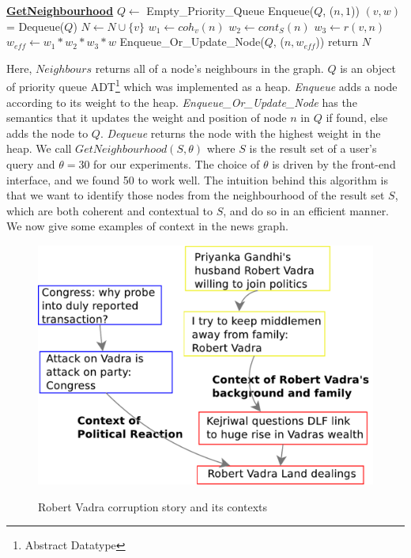 \begin{algorithmic}
  \State \textbf{\underline{GetNeighbourhood}}
  \State {}
  \State {}
    \State $Q \leftarrow$ Empty\_Priority\_Queue
      \State Enqueue($Q$, ($n, 1$))
    \EndFor
      \State $(v, w)$ = Dequeue($Q$)
        \State $N \leftarrow N \cup \{v\}$
          \State $w_1 \leftarrow coh_{v}(n)$
          \State $w_2 \leftarrow cont_{S}(n)$
          \State $w_3 \leftarrow r(v,n)$
          \State $w_{eff} \leftarrow w_1 * w_2 * w_3 * w$
          \State Enqueue\_Or\_Update\_Node($Q$, ($n, w_{eff}$))
        \EndFor
      \EndIf
    \EndWhile
    \State return $N$
\end{algorithmic}

Here, $Neighbours$ returns all of a node's neighbours in the graph. $Q$ is an object of priority queue ADT\footnote{Abstract Datatype} which was implemented as a heap. \emph{Enqueue} adds a node according to its weight to the heap. \emph{Enqueue\_Or\_Update\_Node} has the semantics that it updates the weight and position of node $n$ in $Q$ if found, else adds the node to $Q$.
\emph{Dequeue} returns the node with the highest weight in the heap. We call $GetNeighbourhood(S, \theta)$ where $S$ is the result set of a user's query and $\theta = 30$ for our experiments. The choice of $\theta$ is driven by the front-end interface, and we found 50 to work well.
The intuition behind this algorithm is that we want to identify those nodes from the neighbourhood of the result set $S$, which are both coherent and contextual to $S$, and do so in an efficient manner.
We now give some examples of context in the news graph.

\begin{figure}

\caption{Robert Vadra corruption story and its contexts}
\includegraphics[scale=0.36]{figures/graph-vadra.pdf}
\label{fig:vadra-corruption}
\end{figure}

